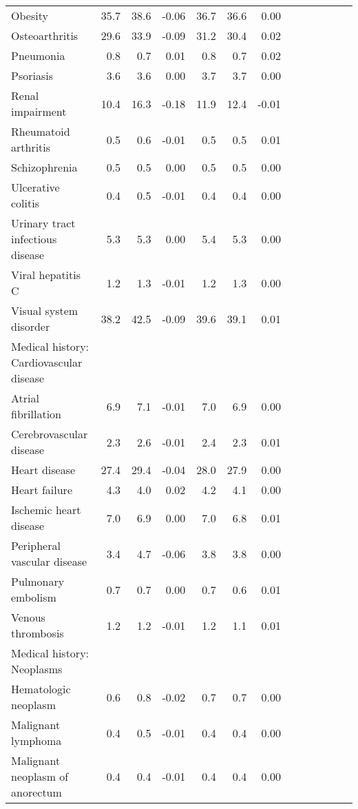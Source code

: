 \documentclass[11pt,]{article}
\begin{document}
\begin{longtable}{lrrrrrrrrrrrr}
      Obesity & 35.7 & 38.6 & -0.06 & 36.7 & 36.6 &  0.00 \\ 
      Osteoarthritis & 29.6 & 33.9 & -0.09 & 31.2 & 30.4 &  0.02 \\ 
      Pneumonia &  0.8 &  0.7 &  0.01 &  0.8 &  0.7 &  0.02 \\ 
      Psoriasis &  3.6 &  3.6 &  0.00 &  3.7 &  3.7 &  0.00 \\ 
      Renal impairment & 10.4 & 16.3 & -0.18 & 11.9 & 12.4 & -0.01 \\ 
      Rheumatoid arthritis &  0.5 &  0.6 & -0.01 &  0.5 &  0.5 &  0.01 \\ 
      Schizophrenia &  0.5 &  0.5 &  0.00 &  0.5 &  0.5 &  0.00 \\ 
      Ulcerative colitis &  0.4 &  0.5 & -0.01 &  0.4 &  0.4 &  0.00 \\ 
      Urinary tract infectious disease &  5.3 &  5.3 &  0.00 &  5.4 &  5.3 &  0.00 \\ 
      Viral hepatitis C &  1.2 &  1.3 & -0.01 &  1.2 &  1.3 &  0.00 \\ 
      Visual system disorder & 38.2 & 42.5 & -0.09 & 39.6 & 39.1 &  0.01 \\ 
  Medical history: Cardiovascular disease &    &    &     &    &    &     \\ 
      Atrial fibrillation &  6.9 &  7.1 & -0.01 &  7.0 &  6.9 &  0.00 \\ 
      Cerebrovascular disease &  2.3 &  2.6 & -0.01 &  2.4 &  2.3 &  0.01 \\ 
      Heart disease & 27.4 & 29.4 & -0.04 & 28.0 & 27.9 &  0.00 \\ 
      Heart failure &  4.3 &  4.0 &  0.02 &  4.2 &  4.1 &  0.00 \\ 
      Ischemic heart disease &  7.0 &  6.9 &  0.00 &  7.0 &  6.8 &  0.01 \\ 
      Peripheral vascular disease &  3.4 &  4.7 & -0.06 &  3.8 &  3.8 &  0.00 \\ 
      Pulmonary embolism &  0.7 &  0.7 &  0.00 &  0.7 &  0.6 &  0.01 \\ 
      Venous thrombosis &  1.2 &  1.2 & -0.01 &  1.2 &  1.1 &  0.01 \\ 
  Medical history: Neoplasms &    &    &     &    &    &     \\ 
      Hematologic neoplasm &  0.6 &  0.8 & -0.02 &  0.7 &  0.7 &  0.00 \\ 
      Malignant lymphoma &  0.4 &  0.5 & -0.01 &  0.4 &  0.4 &  0.00 \\ 
      Malignant neoplasm of anorectum &  0.4 &  0.4 & -0.01 &  0.4 &  0.4 &  0.00 \\ 

\end{longtable}
\end{document}
